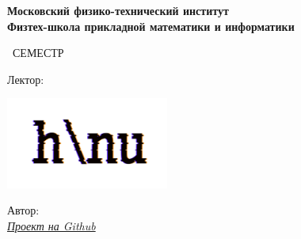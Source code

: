 \begin{titlepage}
	\clearpage\thispagestyle{empty}
	\centering
	
	\textbf{Московский физико-технический институт \\ Физтех-школа прикладной математики и информатики}
	\vspace{33ex}
	
	{\textbf{\FullCourseNameFirstPart}}
	
	\SemesterNumber\ СЕМЕСТР  
	\vspace{1ex}
	
	Лектор: \textit{\LecturerInitials}
	
	\ifdefined\nologo\else
		\includegraphics[width=0.4\textwidth]{images/logo_ltc.png}
	\fi

	\begin{flushright}
		\noindent
		Автор: \href{\VKLink}{\textit{\AuthorInitials}}
		\\
		\href{\GithubLink}{\textit{Проект на Github}}
	\end{flushright}
	
	\vfill
	\CourseDate
	\pagebreak
\end{titlepage}

